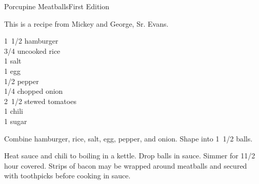 \begin{entry}{Porcupine Meatballs}{First Edition}

\begin{open}
  This is a recipe from Mickey and George, Sr. Evans.
\end{open}
\begin{ingredients}
  \SI{1/2}[1]{\pound} hamburger \\
  \SI{3/4}{\cup} uncooked rice \\
  \SI{1}{\teaspoon} salt \\
  1 egg \\
  \SI{1/2}{\teaspoon} pepper \\
  \SI{1/4}{\cup} chopped onion \\
  \SI{1/2}[2]{\cup} stewed tomatoes \\
  \SI{1}{\teaspoon} chili \\
  \SI{1}{\teaspoon} sugar
\end{ingredients}
Combine hamburger, rice, salt, egg, pepper, and onion.  Shape into
\SI{1/2}[1]{\inch} balls.

Heat sauce and chili to boiling in a kettle.  Drop balls in sauce.  Simmer for
1\num{1/2} hour covered.  Strips of bacon may be wrapped around meatballs
and secured with toothpicks before cooking in sauce.
\end{entry}

